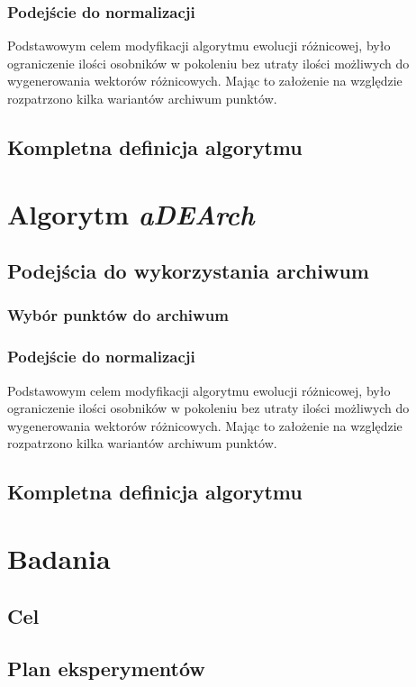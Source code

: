 \documentclass[12pt,a4paper]{report}
\begin{document}
{{{{\subsection{Podejście do normalizacji}

Podstawowym celem modyfikacji algorytmu ewolucji różnicowej, było ograniczenie ilości osobników w pokoleniu bez utraty ilości możliwych do wygenerowania wektorów różnicowych. Mając to założenie na względzie rozpatrzono kilka wariantów archiwum punktów.
\section{Kompletna definicja algorytmu}

\chapter{Algorytm \emph{aDEArch}}
\par{

}
\section{Podejścia do wykorzystania archiwum}
\subsection{Wybór punktów do archiwum}
\subsection{Podejście do normalizacji}

Podstawowym celem modyfikacji algorytmu ewolucji różnicowej, było ograniczenie ilości osobników w pokoleniu bez utraty ilości możliwych do wygenerowania wektorów różnicowych. Mając to założenie na względzie rozpatrzono kilka wariantów archiwum punktów.
\section{Kompletna definicja algorytmu}


\chapter{Badania}
\section{Cel}
\section{Plan eksperymentów}
}}}}
\end{document}
